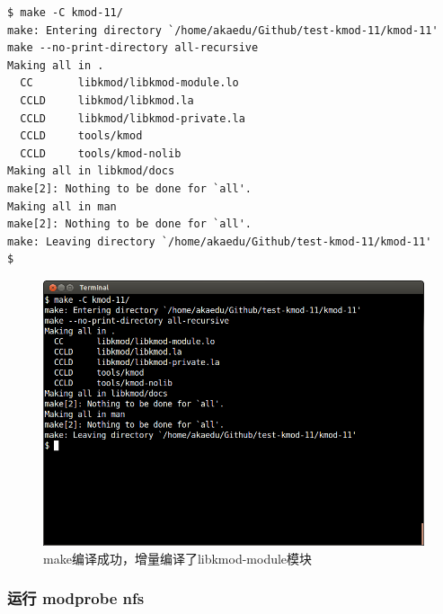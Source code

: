 \documentclass[11pt,a4paper]{article}
\makeatletter
\def\maxwidth{\ifdim\Gin@nat@width>\linewidth\linewidth
\else\Gin@nat@width\fi}
\let\Oldincludegraphics\includegraphics
\renewcommand{\includegraphics}[1]{\Oldincludegraphics[width=\maxwidth]{#1}}
\makeatother
\begin{document}
{\begin{shaded}\begin{verbatim}
$ make -C kmod-11/
make: Entering directory `/home/akaedu/Github/test-kmod-11/kmod-11'
make --no-print-directory all-recursive
Making all in .
  CC       libkmod/libkmod-module.lo
  CCLD     libkmod/libkmod.la
  CCLD     libkmod/libkmod-private.la
  CCLD     tools/kmod
  CCLD     tools/kmod-nolib
Making all in libkmod/docs
make[2]: Nothing to be done for `all'.
Making all in man
make[2]: Nothing to be done for `all'.
make: Leaving directory `/home/akaedu/Github/test-kmod-11/kmod-11'
$ 
\end{verbatim}\end{shaded}}
\begin{figure}[htbp]
\centering
\includegraphics{./pictures/3-2-make.png}
\caption{make编译成功，增量编译了libkmod-module模块}
\end{figure}

\subsubsection{运行 modprobe nfs}
\end{document}
